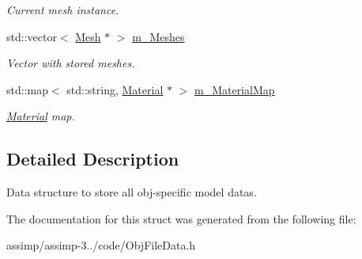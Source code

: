 \begin{DoxyCompactItemize}
\begin{DoxyCompactList}\small\item\em Current mesh instance. \end{DoxyCompactList}\item 
\hypertarget{struct_assimp_1_1_obj_file_1_1_model_a5837d5c5a29d4d6a99a958ab41b60f5d}{std\+::vector$<$ \hyperlink{struct_assimp_1_1_obj_file_1_1_mesh}{Mesh} $\ast$ $>$ \hyperlink{struct_assimp_1_1_obj_file_1_1_model_a5837d5c5a29d4d6a99a958ab41b60f5d}{m\+\_\+\+Meshes}}\label{struct_assimp_1_1_obj_file_1_1_model_a5837d5c5a29d4d6a99a958ab41b60f5d}

\begin{DoxyCompactList}\small\item\em Vector with stored meshes. \end{DoxyCompactList}\item 
\hypertarget{struct_assimp_1_1_obj_file_1_1_model_a1147d3060f1136f04b792c2c8038fbd7}{std\+::map$<$ std\+::string, \hyperlink{struct_assimp_1_1_obj_file_1_1_material}{Material} $\ast$ $>$ \hyperlink{struct_assimp_1_1_obj_file_1_1_model_a1147d3060f1136f04b792c2c8038fbd7}{m\+\_\+\+Material\+Map}}\label{struct_assimp_1_1_obj_file_1_1_model_a1147d3060f1136f04b792c2c8038fbd7}

\begin{DoxyCompactList}\small\item\em \hyperlink{struct_assimp_1_1_obj_file_1_1_material}{Material} map. \end{DoxyCompactList}\end{DoxyCompactItemize}


\subsection{Detailed Description}
Data structure to store all obj-\/specific model datas. 

The documentation for this struct was generated from the following file\+:\begin{DoxyCompactItemize}
\item 
assimp/assimp-\/3../code/Obj\+File\+Data.\+h\end{DoxyCompactItemize}
